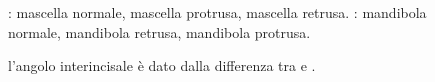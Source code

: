 \begin{figure}[p!]
 \quad
{}
 \centering
 \caption{ : mascella normale, mascella protrusa, mascella retrusa.  : mandibola normale, mandibola retrusa, mandibola protrusa.}
 \label{fig:steiner_sna_snb}
\end{figure}
\begin{figure}[p!]
 \centering
 \caption{l'angolo interincisale  è dato dalla differenza tra  e .}
 \label{fig:steiner_anb}
\end{figure}

